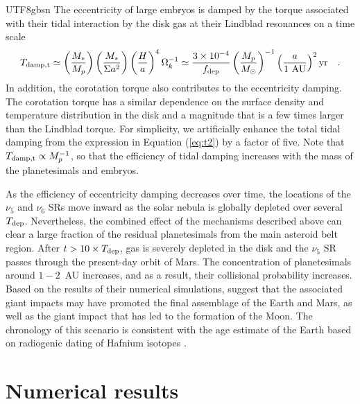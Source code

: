 \documentclass[tighten]{aastex6}
\begin{document}
\begin{CJK*}{UTF8}{gbsn}
The eccentricity of large embryos is damped by the torque associated with 
their tidal interaction by the disk gas at their Lindblad resonances 
\citep{ward1989, ward1993, artymowicz1993, thommes2008} on a time scale 
%
\begin{eqnarray} 
T_{\rm damp,t} \simeq 
	\left(\frac{M_{\ast}}{M_{p}}\right)
	\left(\frac{M_{\ast}}{\Sigma a^2} \right)
	\left(\frac{H}{a}\right)^4 \Omega_{k}^{-1} 
	\simeq {3 \times 10^{-4} \over f_{\rm dep}} 
	\left(M_p \over {M_\odot}\right)^{-1}
	\left( {a \over {1~{\rm AU}}} \right)^2 {\rm yr} \quad .
\label{eq:t2}
\end{eqnarray}
%
In addition, the corotation torque \citep[e.g.,][]{paardekooper2011} 
also contributes to the eccentricity damping. The corotation torque 
has a similar dependence on the surface density and temperature 
distribution in the disk and a magnitude that is a few times
larger than the Lindblad torque.  For simplicity, we artificially 
enhance the total tidal damping from the expression in Equation 
(\ref{eq:t2}) by a factor of five. Note that $T_{\rm damp,t} \propto 
M_p^{-1}$, so that the efficiency of tidal damping increases with 
the mass of the planetesimals and embryos.

As the efficiency of eccentricity damping decreases over time, the locations 
of the $\nu_5$ and $\nu_6$ SRs move inward as the solar nebula is 
globally depleted over several $T_{\rm dep}$.  Nevertheless, the combined 
effect of the mechanisms described above can clear a large fraction of 
the residual planetesimals from the main asteroid belt region. 
After $t > 10 \times T_{\rm dep}$, gas is severely depleted in the disk
and the $\nu_5$ SR passes through the present-day orbit of Mars. The 
concentration of planetesimals around $1-2$~AU increases, and 
as a result, their collisional probability increases. Based on the results of
their numerical simulations, \cite{thommes2008} suggest that 
the associated giant impacts may have promoted the final 
assemblage of the Earth and Mars, as well as the giant impact that
has led to the formation of the Moon. The chronology of 
this scenario is consistent with the 
age estimate of the Earth based on radiogenic dating of Hafnium isotopes \citep{kleine2009}.





\section{Numerical results}
\label{sec:result}


\end{CJK*}
\end{document}
